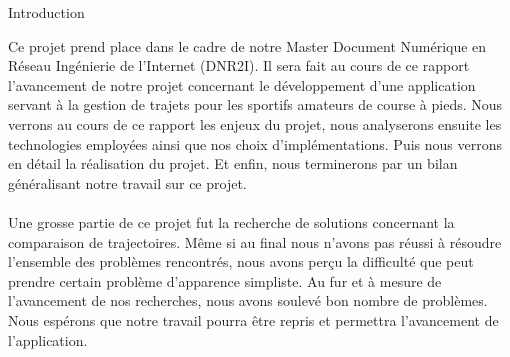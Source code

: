 {\Huge{Introduction}}

\vspace{2cm}
Ce projet prend place dans le cadre de notre Master Document Numérique en Réseau Ingénierie de l'Internet (DNR2I). Il sera fait au cours de ce rapport l'avancement de notre projet concernant le développement d'une application servant à la gestion de trajets pour les sportifs amateurs de course à pieds. Nous verrons au cours de ce rapport les enjeux du projet, nous analyserons ensuite les technologies employées ainsi que nos choix d'implémentations. Puis nous verrons en détail la réalisation du projet. Et enfin, nous terminerons par un bilan généralisant notre travail sur ce projet.
\paragraph{}
Une grosse partie de ce projet fut la recherche de solutions concernant la comparaison de trajectoires. Même si au final nous n'avons pas réussi à résoudre l'ensemble des problèmes rencontrés, nous avons perçu la difficulté que peut prendre certain problème d'apparence simpliste. Au fur et à mesure de l'avancement de nos recherches, nous avons soulevé bon nombre de problèmes. Nous espérons que notre travail pourra être repris et permettra l'avancement de l'application.